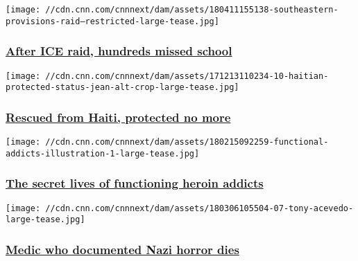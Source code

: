 \href{/2018/04/12/us/tennessee-immigration-raid-schools-impact/index.html}{}

\texttt{[image: //cdn.cnn.com/cnnnext/dam/assets/180411155138-southeastern-provisions-raid---restricted-large-tease.jpg]}

\hypertarget{after-ice-raid-hundreds-missed-school}{%
\subsubsection{\texorpdfstring{\href{/2018/04/12/us/tennessee-immigration-raid-schools-impact/index.html}{After
ICE raid, hundreds missed
school}}{After ICE raid, hundreds missed school}}\label{after-ice-raid-hundreds-missed-school}}

\href{/2017/12/19/us/haitians-lose-protected-status/index.html}{}

\texttt{[image: //cdn.cnn.com/cnnnext/dam/assets/171213110234-10-haitian-protected-status-jean-alt-crop-large-tease.jpg]}

\hypertarget{rescued-from-haiti-protected-no-more}{%
\subsubsection{\texorpdfstring{\href{/2017/12/19/us/haitians-lose-protected-status/index.html}{Rescued
from Haiti, protected no
more}}{Rescued from Haiti, protected no more}}\label{rescued-from-haiti-protected-no-more}}

\href{/2018/02/27/health/functioning-heroin-addicts/index.html}{}

\texttt{[image: //cdn.cnn.com/cnnnext/dam/assets/180215092259-functional-addicts-illustration-1-large-tease.jpg]}

\hypertarget{the-secret-lives-of-functioning-heroin-addicts}{%
\subsubsection{\texorpdfstring{\href{/2018/02/27/health/functioning-heroin-addicts/index.html}{The
secret lives of functioning heroin
addicts}}{The secret lives of functioning heroin addicts}}\label{the-secret-lives-of-functioning-heroin-addicts}}

\href{/2018/03/08/health/world-war-ii-medic-anthony-acevedo-obit/index.html}{}

\texttt{[image: //cdn.cnn.com/cnnnext/dam/assets/180306105504-07-tony-acevedo-large-tease.jpg]}

\hypertarget{medic-who-documented-nazi-horror-dies}{%
\subsubsection{\texorpdfstring{\href{/2018/03/08/health/world-war-ii-medic-anthony-acevedo-obit/index.html}{Medic
who documented Nazi horror
dies}}{Medic who documented Nazi horror dies}}\label{medic-who-documented-nazi-horror-dies}}

